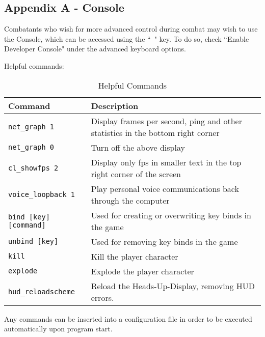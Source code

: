 \subsection{Appendix A - Console}
\label{Appendix_A_Console}
Combatants who wish for more advanced control during combat may wish to use the Console, which can be accessed using the ``~" key. To do so, check ``Enable Developer Console" under the advanced keyboard options.

Helpful commands:
\begin{table}[h!b!p!]
\caption{Helpful Commands}
\begin{tabular}{|l|p{10.5cm}|}
	\hline
		Command & Description\\
	\hline
	\texttt{net\_graph 1}&Display frames per second, ping and other statistics in the bottom right corner\\
	\texttt{net\_graph 0}&Turn off the above display\\
	\texttt{cl\_showfps 2}&Display only fps in smaller text in the top right corner of the screen\\
	\texttt{voice\_loopback 1}&Play personal voice communications back through the computer\\
	\texttt{bind [key] [command]}&Used for creating or overwriting key binds in the game\\
	\texttt{unbind [key]}&Used for removing key binds in the game\\
	\texttt{kill}&Kill the player character\\
	\texttt{explode}&Explode the player character\\
	\texttt{hud\_reloadscheme}&Reload the Heads-Up-Display, removing HUD errors.\\
  	\hline
\end{tabular}
\label{table_common_actions}
\end{table}


Any commands can be inserted into a configuration file in order to be executed automatically upon program start.